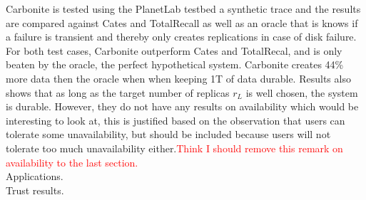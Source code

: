 \documentclass{article}
\begin{document}
\noindent Carbonite is tested using the PlanetLab testbed a synthetic trace and the results are compared against Cates and TotalRecall as well as an oracle that is knows if a failure is transient and thereby only creates replications in case of disk failure. For both test cases, Carbonite outperform Cates and TotalRecal, and is only beaten by the oracle, the perfect hypothetical system. Carbonite creates 44\% more data then the oracle when when keeping 1T of data durable. Results also shows that as long as the target number of replicas $r_L$ is well chosen, the system is durable. However, they do not have any results on availability which would be interesting to look at, this is justified based on the observation that users can tolerate some unavailability, but should be included because users will not tolerate too much unavailability either.\textcolor{red}{Think I should remove this remark on availability to the last section.}\\

\noindent Applications.\\

\noindent Trust results.\\
\end{document}
